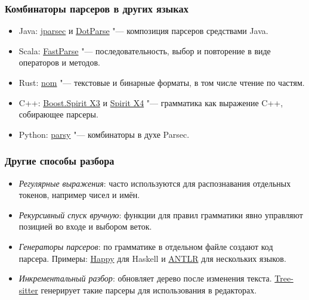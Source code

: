 \documentclass[11pt]{beamer}
\begin{document}
\begin{frame}[fragile]
  \frametitle{Комбинаторы парсеров в других языках}
  \begin{itemize}
    \item Java: \href{https://github.com/jparsec/jparsec}{jparsec} и \href{https://github.com/google/mug/blob/master/dot-parse/README.md}{DotParse} "--- композиция парсеров средствами Java.
    \item Scala: \href{https://com-lihaoyi.github.io/fastparse/}{FastParse} "--- последовательность, выбор и повторение в виде операторов и методов.
    \item Rust: \href{https://github.com/rust-bakery/nom}{nom} "--- текстовые и бинарные форматы, в том числе чтение по частям.
    \item C++: \href{https://www.boost.org/doc/libs/latest/libs/spirit/doc/x3/html/index.html}{Boost.Spirit X3} и \href{https://github.com/boostorg/spirit_x4}{Spirit X4} "--- грамматика как выражение C++, собирающее парсеры.
    \item Python: \href{https://parsy.readthedocs.io/en/latest/overview.html}{parsy} "--- комбинаторы в духе Parsec.
  \end{itemize}
\end{frame}

\begin{frame}[fragile]
  \frametitle{Другие способы разбора}
  \begin{itemize}
    \item \emph{Регулярные выражения}: часто используются для распознавания отдельных токенов, например чисел и имён.
    \item \emph{Рекурсивный спуск вручную}: функции для правил грамматики явно управляют позицией во входе и выбором веток.
    \item \emph{Генераторы парсеров}: по грамматике в отдельном файле создают код парсера. Примеры: \href{https://haskell-happy.readthedocs.io/en/latest/}{Happy} для Haskell и \href{https://www.antlr.org/}{ANTLR} для нескольких языков.
    \item \emph{Инкрементальный разбор}: обновляет дерево после изменения текста. \href{https://tree-sitter.github.io/tree-sitter/}{Tree-sitter} генерирует такие парсеры для использования в редакторах.
  \end{itemize}
\end{frame}
\end{document}
